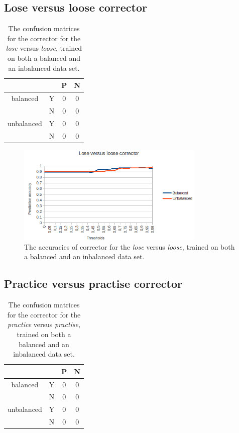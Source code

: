 \documentclass[12pt]{article}
\begin{document}
\subsection{Lose versus loose corrector}

\begin{table}[H] \footnotesize
\centering
\begin{tabular}{|c|c|c|c|}
\hline
&&P&N\\
\hline
balanced&Y&0&0\\
&N&0&0\\
\hline
\hline
unbalanced&Y&0&0\\
&N&0&0\\
\hline
\end{tabular}
\caption{The confusion matrices for the corrector for the \emph{lose} versus \emph{loose}, trained on both a balanced and an inbalanced data set.}
\end{table}

\begin{figure}[H]
\centering
\includegraphics[width=0.8\textwidth]{accuracy_loseloose.png}
\caption{The accuracies of corrector for the \emph{lose} versus \emph{loose}, trained on both a balanced and an inbalanced data set.}
\end{figure}

\subsection{Practice versus practise corrector}

\begin{table}[H] \footnotesize
\centering
\begin{tabular}{|c|c|c|c|}
\hline
&&P&N\\
\hline
balanced&Y&0&0\\
&N&0&0\\
\hline
\hline
unbalanced&Y&0&0\\
&N&0&0\\
\hline
\end{tabular}
\caption{The confusion matrices for the corrector for the \emph{practice} versus \emph{practise}, trained on both a balanced and an inbalanced data set.}
\end{table}
\end{document}
